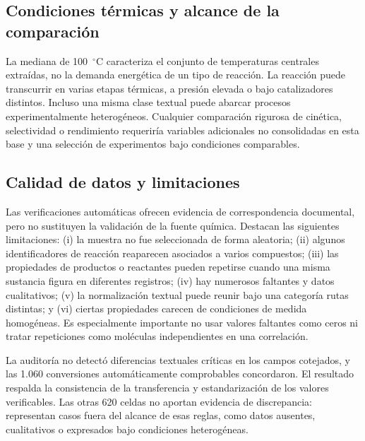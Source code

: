 \subsection{Condiciones térmicas y alcance de la comparación}
La mediana de 100~$^\circ$C caracteriza el conjunto de temperaturas centrales extraídas, no la demanda energética de un tipo de reacción. La reacción puede transcurrir en varias etapas térmicas, a presión elevada o bajo catalizadores distintos. Incluso una misma clase textual puede abarcar procesos experimentalmente heterogéneos. Cualquier comparación rigurosa de cinética, selectividad o rendimiento requeriría variables adicionales no consolidadas en esta base y una selección de experimentos bajo condiciones comparables.

\subsection{Calidad de datos y limitaciones}
Las verificaciones automáticas ofrecen evidencia de correspondencia documental, pero no sustituyen la validación de la fuente química. Destacan las siguientes limitaciones: (i) la muestra no fue seleccionada de forma aleatoria; (ii) algunos identificadores de reacción reaparecen asociados a varios compuestos; (iii) las propiedades de productos o reactantes pueden repetirse cuando una misma sustancia figura en diferentes registros; (iv) hay numerosos faltantes y datos cualitativos; (v) la normalización textual puede reunir bajo una categoría rutas distintas; y (vi) ciertas propiedades carecen de condiciones de medida homogéneas. Es especialmente importante no usar valores faltantes como ceros ni tratar repeticiones como moléculas independientes en una correlación.

La auditoría no detectó diferencias textuales críticas en los campos cotejados, y las 1.060 conversiones automáticamente comprobables concordaron. El resultado respalda la consistencia de la transferencia y estandarización de los valores verificables. Las otras 620 celdas no aportan evidencia de discrepancia: representan casos fuera del alcance de esas reglas, como datos ausentes, cualitativos o expresados bajo condiciones heterogéneas.
